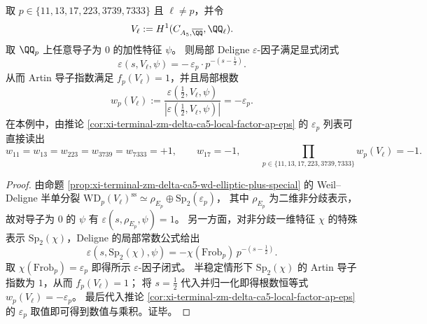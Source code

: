 \begin{theorem}\label{thm:xi-terminal-zm-delta-ca5-local-epsilon-factor-from-node-sign}
取 \(p\in\{11,13,17,223,3739,7333\}\) 且 \(\ell\neq p\)，并令
\[
V_\ell:=H^1(C_{A_5,\overline{\QQ}},\QQ_\ell).
\]
取 \(\QQ_p\) 上任意导子为 \(0\) 的加性特征 \(\psi\)。
则局部 Deligne \(\varepsilon\)-因子满足显式闭式
\[
\varepsilon\!\left(s,V_\ell,\psi\right)=-\,\varepsilon_p\cdot p^{-(s-\tfrac12)}.
\]
从而 Artin 导子指数满足 \(f_p(V_\ell)=1\)，并且局部根数
\[
w_p(V_\ell):=\frac{\varepsilon(\tfrac12,V_\ell,\psi)}{\left|\varepsilon(\tfrac12,V_\ell,\psi)\right|}
=-\varepsilon_p.
\]
在本例中，由推论 \ref{cor:xi-terminal-zm-delta-ca5-local-factor-ap-eps} 的 \(\varepsilon_p\) 列表可直接读出
\[
w_{11}=w_{13}=w_{223}=w_{3739}=w_{7333}=+1,\qquad w_{17}=-1,
\qquad
\prod_{p\in\{11,13,17,223,3739,7333\}}w_p(V_\ell)=-1.
\]
\end{theorem}
\begin{proof}
由命题 \ref{prop:xi-terminal-zm-delta-ca5-wd-elliptic-plus-special} 的 Weil--Deligne 半单分裂
\(
\mathrm{WD}_p(V_\ell)^{\mathrm{ss}}\simeq \rho_{E_p}\oplus \mathrm{Sp}_2(\varepsilon_p)
\)，
其中 \(\rho_{E_p}\) 为二维非分歧表示，故对导子为 \(0\) 的 \(\psi\) 有
\(
\varepsilon(s,\rho_{E_p},\psi)=1
\)。
另一方面，对非分歧一维特征 \(\chi\) 的特殊表示 \(\mathrm{Sp}_2(\chi)\)，Deligne 的局部常数公式给出
\[
\varepsilon\!\left(s,\mathrm{Sp}_2(\chi),\psi\right)=-\chi(\mathrm{Frob}_p)\,p^{-(s-\tfrac12)}.
\]
取 \(\chi(\mathrm{Frob}_p)=\varepsilon_p\) 即得所示 \(\varepsilon\)-因子闭式。
半稳定情形下 \(\mathrm{Sp}_2(\chi)\) 的 Artin 导子指数为 \(1\)，从而 \(f_p(V_\ell)=1\)；
将 \(s=\tfrac12\) 代入并归一化即得根数恒等式 \(w_p(V_\ell)=-\varepsilon_p\)。
最后代入推论 \ref{cor:xi-terminal-zm-delta-ca5-local-factor-ap-eps} 的 \(\varepsilon_p\) 取值即可得到数值与乘积。证毕。
\end{proof}

